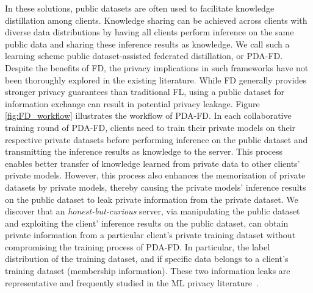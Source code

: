 In these solutions, public datasets are often used to facilitate knowledge distillation among clients.
Knowledge sharing can be achieved across clients with diverse data distributions by having all clients perform inference on the same public data and sharing these inference results as knowledge.
We call such a learning scheme public dataset-assisted federated distillation, or PDA-FD.
Despite the benefits of FD, the privacy implications in such frameworks have not been thoroughly explored in the existing literature.
While FD generally provides stronger privacy guarantees than traditional FL, using a public dataset for information exchange can result in potential privacy leakage. 
Figure \ref{fig:FD_workflow} illustrates the workflow of PDA-FD. In each collaborative training round of PDA-FD, clients need to train their private models on their respective private datasets before performing inference on the public dataset and transmitting the inference results as knowledge to the server. This process enables better transfer of knowledge learned from private data to other clients' private models. However, this process also enhances the memorization of private datasets by private models, thereby causing the private models' inference results on the public dataset to leak private information from the private dataset. 
We discover that an \textit{honest-but-curious} server, via manipulating the public dataset and exploiting the client' inference results on the public dataset, can obtain private information from a particular client's private training dataset without compromising the training process of PDA-FD. 
In particular, the label distribution of the training dataset, and if specific data belongs to a client's training dataset (membership information). These two information leaks are representative and frequently studied in the ML privacy literature~\cite{gu2023ldia, yang2022fd, nasr2019comprehensive}.


